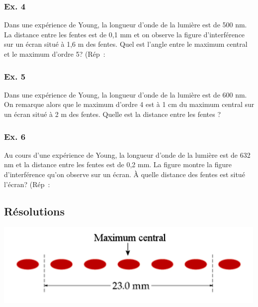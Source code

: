 \subsubsection{Ex. 4}
Dans une expérience de Young, la longueur d'onde de la lumière est de
500 nm. La distance entre les fentes est de 0,1 mm et on observe la
figure d'interférence sur un écran situé à 1,6 m des fentes. Quel est
l'angle entre le maximum central et le maximum d'ordre 5? (Rép~:
\subsubsection{Ex. 5}
Dans une expérience de Young, la longueur d'onde de la lumière est de
600 nm.
On remarque alors que le maximum d'ordre 4 est à 1 cm du maximum central
sur un écran situé à 2 m des fentes. Quelle est la distance entre les
fentes\textbf{ }? 

\subsubsection{Ex. 6}
Au cours d'une expérience de Young, la longueur d'onde de la lumière
est de 632 nm et la distance entre les fentes est de 0,2 mm. La figure montre la figure
d'interférence qu'on observe sur un écran. À quelle distance des fentes est situé
l'écran? (Rép~:

\subsection{Résolutions}
\includegraphics[width=13.259cm,height=4.045cm]{Pictures/100000010000059F000001B75001F99348A6D888.png}

